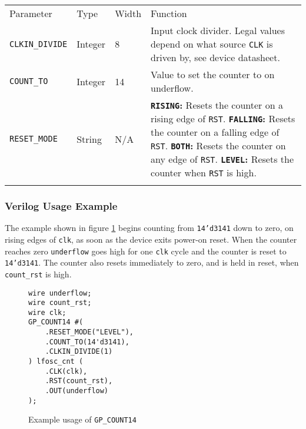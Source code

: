 \documentclass[11pt]{article}
\newcommand{\tokenstyle}[1]{\texttt{#1}}
\newcommand{\wirestyle}[1]{\texttt{#1}}
\newcommand{\valuestyle}[1]{\texttt{#1}}
\newcommand{\strvaluestyle}[1]{\valuestyle{\textquotedbl#1\textquotedbl}}
\newcommand{\strexamplestyle}[1]{\textbf{\strvaluestyle{#1}:}}
\newcommand{\datastyle}[1]{\texttt{#1}}
\newcommand{\whenstyle}[1]{{\fontseries{sb}\selectfont#1}}
\newcommand{\thinhline}{\Xhline{1\arrayrulewidth}}
\newcommand{\thickhline}{\Xhline{2.5\arrayrulewidth}}
\begin{document}
\begin{tabularx}{\textwidth}{lllX}
\thinhline
\whenstyle{Parameter} & \whenstyle{Type} & \whenstyle{Width} & \whenstyle{Function} \\
\thickhline
\tokenstyle{CLKIN\_DIVIDE} & Integer & 8 &
	Input clock divider. Legal values depend on what source \tokenstyle{CLK} is driven by, see device datasheet.\\
\thinhline
\tokenstyle{COUNT\_TO} & Integer & 14 & Value to set the counter to on underflow. \\
\thinhline
\tokenstyle{RESET\_MODE} & String & N/A &
	\strexamplestyle{RISING} Resets the counter on a rising edge of \tokenstyle{RST}. \newline
	\strexamplestyle{FALLING} Resets the counter on a falling edge of \tokenstyle{RST}. \newline
	\strexamplestyle{BOTH} Resets the counter on any edge of \tokenstyle{RST}. \newline
	\strexamplestyle{LEVEL} Resets the counter when \tokenstyle{RST} is high. \\
\thinhline
\end{tabularx}

\subsubsection{Verilog Usage Example}

The example shown in figure \ref{gp-count14-example} begins counting from \datastyle{14'd3141} down to zero, on 
rising edges of \wirestyle{clk}, as soon as the device exits power-on reset. When the counter reaches zero 
\wirestyle{underflow} goes high for one \wirestyle{clk} cycle and the counter is reset to \datastyle{14'd3141}.
The counter also resets immediately to zero, and is held in reset, when \wirestyle{count\_rst} is high.

\begin{figure}[h]
\begin{lstlisting}
wire underflow;
wire count_rst;
wire clk;
GP_COUNT14 #(
	.RESET_MODE("LEVEL"),
	.COUNT_TO(14'd3141),
	.CLKIN_DIVIDE(1)
) lfosc_cnt (
	.CLK(clk),
	.RST(count_rst),
	.OUT(underflow)
);
\end{lstlisting}
\caption{Example usage of \tokenstyle{GP\_COUNT14}}
\label{gp-count14-example}
\end{figure}

\end{document}
